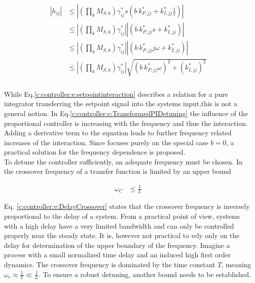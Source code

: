 \begin{align}
\begin{split}
\left|h_{ij}\right| &\leq \left| \left(\prod_k M_{S,k} \right) \gamma_{ij}^* s \left(b~k_{P,jj}^* + k_{I,jj}^* \frac{1}{s} \right) \right| \\
&\leq \left| \left(\prod_k M_{S,k} \right) \gamma_{ij}^*\right| \left|\left(b~k_{P,jj}^* s+ k_{I,jj}^* \right) \right| \\
&\leq \left| \left(\prod_k M_{S,k} \right) \gamma_{ij}^*\right| \left|\left(b~k_{P,jj}^* j\omega+ k_{I,jj}^* \right) \right| \\
&\leq \left| \left(\prod_k M_{S,k} \right) \gamma_{ij}^*\right| \sqrt{\left(b~k_{P,jj}^*\omega\right)^2+ \left(k_{I,jj}^*\right)^2} \\
\end{split}
\label{c:controller:e:TransformedPIDetuning}
\end{align}

While Eq.\ref{c:controller:e:setpointinteraction} describes a relation for a pure integrator transferring the setpoint signal into the systems input,this is not a general notion. In Eq.\ref{c:controller:e:TransformedPIDetuning} the influence of the proportional controller is increasing with the frequency and thus the interaction. Adding a derivative term to the equation leads to further frequency related increases of the interaction. Since \cite{Astrom2001a} focuses purely on the special case $b=0$, a practical solution for the frequency dependence is proposed.\\

To detune the controller sufficiently, an adequate frequency must be chosen. In \cite[p.172 f.]{Skogestad2005} the crossover frequency of a transfer function is limited by an upper bound

\begin{align}
\omega_C &\leq \frac{1}{L}
\label{c:controller:e:DelayCrossover}
\end{align}

Eq. \ref{c:controller:e:DelayCrossover} states that the crossover frequency is inversely proportional to the delay of a system. From a practical point of view, systems with a high delay have a very limited bandwidth and can only be controlled properly near the steady state. It is, however not practical to rely only on the delay for determination of the upper boundary of the frequency. Imagine a process with a small normalized time delay and an induced high first order dynamics. The crossover frequency is dominated by the time constant $T$, meaning $\omega_c \approx \frac{1}{T} \ll \frac{1}{L}$. To ensure a robust detuning, another bound needs to be established.\\

